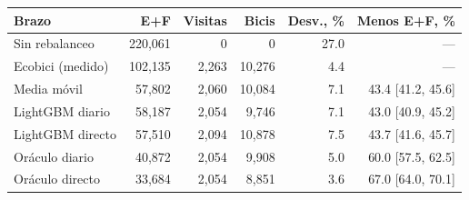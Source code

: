 \begin{tabular}{@{}lrrrrr@{}}
\toprule
Brazo & E+F & Visitas & Bicis & Desv., \% & Menos E+F, \% \\
\midrule
Sin rebalanceo & 220,061 & 0 & 0 & 27.0 & --- \\
Ecobici (medido) & 102,135 & 2,263 & 10,276 & 4.4 & --- \\
Media móvil & 57,802 & 2,060 & 10,084 & 7.1 & 43.4 [41.2, 45.6] \\
LightGBM diario & 58,187 & 2,054 & 9,746 & 7.1 & 43.0 [40.9, 45.2] \\
LightGBM directo & 57,510 & 2,094 & 10,878 & 7.5 & 43.7 [41.6, 45.7] \\
\midrule
Oráculo diario & 40,872 & 2,054 & 9,908 & 5.0 & 60.0 [57.5, 62.5] \\
Oráculo directo & 33,684 & 2,054 & 8,851 & 3.6 & 67.0 [64.0, 70.1] \\
\bottomrule
\end{tabular}
